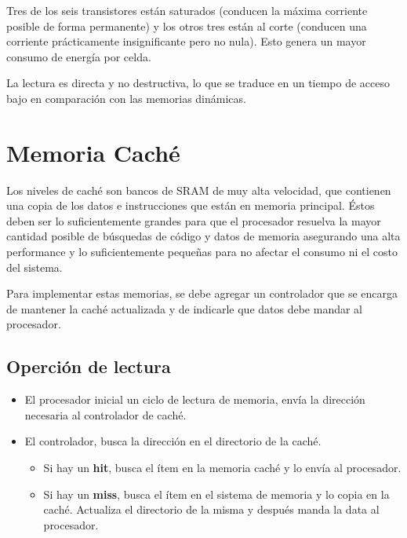 \begin{itemize}
\begin{itemize}
 		Tres de los seis transistores están saturados (conducen la máxima corriente posible de forma permanente) y los otros tres están al corte (conducen una corriente prácticamente insignificante pero no nula). Esto genera un mayor consumo de energía por celda.
 		
 		La lectura es directa y no destructiva, lo que se traduce en un tiempo de acceso bajo en comparación con las memorias dinámicas.
	\end{itemize}

\end{itemize}

\newpage
\section{Memoria Caché}
Los niveles de caché son bancos de SRAM de muy alta velocidad, que contienen una copia de los datos e instrucciones que están en memoria principal. Éstos deben ser lo suficientemente grandes para que el procesador resuelva la mayor cantidad posible de búsquedas de código y datos de memoria asegurando una alta performance y lo suficientemente pequeñas para no afectar el consumo ni el costo del sistema.

Para implementar estas memorias, se debe agregar un controlador que se encarga de mantener la caché actualizada y de indicarle que datos debe mandar al procesador.

\subsection{Operción de lectura}
\begin{itemize}
	\item El procesador inicial un ciclo de lectura de memoria, envía la dirección necesaria al controlador de caché.
	\item El controlador, busca la dirección en el directorio de la caché.
	\begin{itemize}
		\item Si hay un \textbf{hit}, busca el ítem en la memoria caché y lo envía al procesador.
		\item Si hay un \textbf{miss},  busca el ítem en el sistema de memoria y lo copia en la caché. Actualiza el directorio de la misma y después manda la data al procesador.
	\end{itemize}
\end{itemize}

